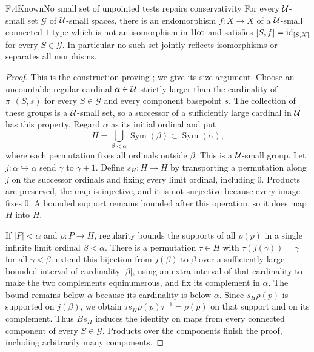 \begin{claim}{F.4}{Known}{No small set of unpointed tests repairs conservativity}
For every $\mathcal U$-small set $\mathcal G$ of $\mathcal U$-small spaces, there is
an endomorphism $f:X\to X$ of a $\mathcal U$-small connected $1$-type which
is not an isomorphism in $\mathrm{Hot}$ and satisfies
$[S,f]=\mathrm{id}_{[S,X]}$ for every $S\in\mathcal G$. In particular no such
set jointly reflects isomorphisms or separates all morphisms.
\end{claim}
\begin{proof}
This is the construction proving
\citet[Theorem~2.1]{ArlinChristensen2023}; we give its size argument.
Choose an uncountable regular cardinal $\alpha\in\mathcal U$ strictly larger
than the cardinality of $\pi_1(S,s)$ for every $S\in\mathcal G$ and
every component basepoint $s$. The collection of these groups is a
$\mathcal U$-small set, so a successor of a sufficiently large cardinal in
$\mathcal U$ has this property. Regard $\alpha$ as its initial ordinal and put
\[
 H=\bigcup_{\beta<\alpha}\operatorname{Sym}(\beta)
       \subset\operatorname{Sym}(\alpha),
\]
where each permutation fixes all ordinals outside $\beta$. This is a
$\mathcal U$-small group. Let $j:\alpha\hookrightarrow\alpha$ send $\gamma$
to $\gamma+1$. Define $s_H:H\to H$ by transporting a permutation along
$j$ on the successor ordinals and fixing every limit ordinal, including
$0$. Products are preserved, the map is injective, and it is not
surjective because every image fixes $0$. A bounded support remains
bounded after this operation, so it does map $H$ into $H$.

If $|P|<\alpha$ and $\rho:P\to H$, regularity bounds the supports of
all $\rho(p)$ in a single infinite limit ordinal $\beta<\alpha$.
There is a permutation $\tau\in H$ with
$\tau(j(\gamma))=\gamma$ for all $\gamma<\beta$: extend this
bijection from $j(\beta)$ to $\beta$ over a sufficiently large
bounded interval of cardinality $|\beta|$, using an extra interval
of that cardinality to make the two complements equinumerous, and
fix its complement in $\alpha$. The bound remains below $\alpha$
because its cardinality is below $\alpha$. Since $s_H\rho(p)$ is
supported on $j(\beta)$, we obtain
$\tau s_H\rho(p)\tau^{-1}=\rho(p)$ on that support and on its
complement. Thus $Bs_H$ induces the identity on maps from every
connected component of every $S\in\mathcal G$. Products over the
components finish the proof, including arbitrarily many components.
\end{proof}

